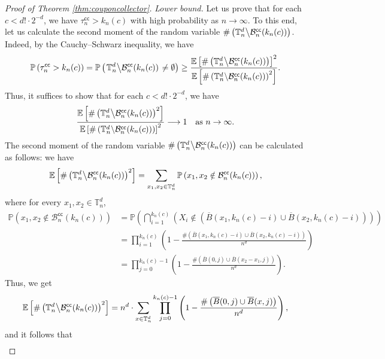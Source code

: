 \documentclass[a4paper,11pt]{article}
\begin{document}
\begin{proof}[Proof of Theorem \ref{thm:couponcollector}]
\emph{Lower bound.}
Let us prove that for each $c<d!\cdot2^{-d}$, we have $\tau_n^\mathsf{cc}>k_n(c)$ with high probability as $n\to\infty$.
To this end, let us calculate the second moment of the random variable $\#\left(\mathbb{T}_n^d\middle\backslash\mathcal{B}_n^\mathsf{cc}(k_n(c))\right)$.
Indeed, by the Cauchy--Schwarz inequality, we have
\[\mathbb{P}\left(\tau_n^\mathsf{cc}>k_n(c)\right)=\mathbb{P}\left(\left.\mathbb{T}_n^d\middle\backslash\mathcal{B}_n^\mathsf{cc}(k_n(c))\right.\neq\emptyset\right)\geq\frac{\mathbb{E}\left[\#\left(\mathbb{T}_n^d\middle\backslash\mathcal{B}_n^\mathsf{cc}(k_n(c))\right)\right]^2}{\mathbb{E}\left[\#\left(\mathbb{T}_n^d\middle\backslash\mathcal{B}_n^\mathsf{cc}(k_n(c))\right)^2\right]}.\]
Thus, it suffices to show that for each $c<d!\cdot2^{-d}$, we have
\begin{equation}\label{eq:couponcollector2ndmomentgoal}
\frac{\mathbb{E}\left[\#\left(\mathbb{T}_n^d\middle\backslash\mathcal{B}_n^\mathsf{cc}(k_n(c))\right)^2\right]}{\mathbb{E}\left[\#\left(\mathbb{T}_n^d\middle\backslash\mathcal{B}_n^\mathsf{cc}(k_n(c))\right)\right]^2}\longrightarrow1\quad\text{as $n\to\infty$.}
\end{equation}
The second moment of the random variable $\#\left(\mathbb{T}_n^d\middle\backslash\mathcal{B}_n^\mathsf{cc}(k_n(c))\right)$ can be calculated as follows: we have
\[\mathbb{E}\left[\#\left(\mathbb{T}_n^d\middle\backslash\mathcal{B}_n^\mathsf{cc}(k_n(c))\right)^2\right]=\sum_{x_1,x_2\in\mathbb{T}_n^d}\mathbb{P}\left(x_1,x_2\notin\mathcal{B}_n^\mathsf{cc}(k_n(c))\right),\]
where for every $x_1,x_2\in\mathbb{T}_n^d$,
\[\begin{split}
\mathbb{P}\left(x_1,x_2\notin\mathcal{B}_n^\mathsf{cc}(k_n(c))\right)&=\mathbb{P}\left(\bigcap_{i=1}^{k_n(c)}\left(X_i\notin\left(\overline{B}(x_1,k_n(c)-i)\cup\overline{B}(x_2,k_n(c)-i)\right)\right)\right)\\
&=\prod_{i=1}^{k_n(c)}\left(1-\frac{\#\left(\overline{B}(x_1,k_n(c)-i)\cup\overline{B}(x_2,k_n(c)-i)\right)}{n^d}\right)\\
&=\prod_{j=0}^{k_n(c)-1}\left(1-\frac{\#\left(\overline{B}(0,j)\cup\overline{B}(x_2-x_1,j)\right)}{n^d}\right).
\end{split}\]
Thus, we get
\[\mathbb{E}\left[\#\left(\mathbb{T}_n^d\middle\backslash\mathcal{B}_n^\mathsf{cc}(k_n(c))\right)^2\right]=n^d\cdot\sum_{x\in\mathbb{T}_n^d}\prod_{j=0}^{k_n(c)-1}\left(1-\frac{\#\left(\overline{B}(0,j)\cup\overline{B}(x,j)\right)}{n^d}\right),\]
and it follows that
\begin{eqnarray*}

\end{eqnarray*}
\end{proof}
\end{document}
